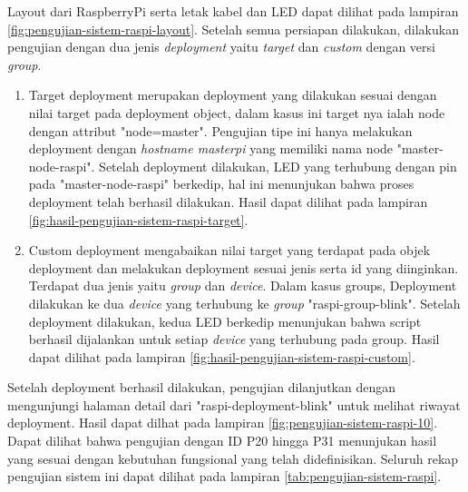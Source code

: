 Layout dari RaspberryPi serta letak kabel dan LED dapat dilihat pada lampiran \ref{fig:pengujian-sistem-raspi-layout}. Setelah semua persiapan dilakukan, dilakukan pengujian dengan dua jenis \textit{deployment} yaitu \textit{target} dan \textit{custom} dengan versi \textit{group}.
\begin{enumerate}
  \item Target deployment merupakan deployment yang dilakukan sesuai dengan nilai target pada deployment object, dalam kasus ini target nya ialah node dengan attribut "node=master". Pengujian tipe ini hanya melakukan deployment dengan \textit{hostname masterpi} yang memiliki nama node "master-node-raspi". Setelah deployment dilakukan, LED yang terhubung dengan pin pada "master-node-raspi" berkedip, hal ini menunjukan bahwa proses deployment telah berhasil dilakukan. Hasil dapat dilihat pada lampiran \ref{fig:hasil-pengujian-sistem-raspi-target}.
  \item Custom deployment mengabaikan nilai target yang terdapat pada objek deployment dan melakukan deployment sesuai jenis serta id yang diinginkan. Terdapat dua jenis yaitu \textit{group} dan \textit{device}. Dalam kasus groups, Deployment dilakukan ke dua \textit{device} yang terhubung ke \textit{group} "raspi-group-blink". Setelah deployment dilakukan, kedua LED berkedip menunjukan bahwa script berhasil dijalankan untuk setiap \textit{device} yang terhubung pada group. Hasil dapat dilihat pada lampiran \ref{fig:hasil-pengujian-sistem-raspi-custom}.
\end{enumerate}

Setelah deployment berhasil dilakukan, pengujian dilanjutkan dengan mengunjungi halaman detail dari "raspi-deployment-blink" untuk melihat riwayat deployment. Hasil dapat dilhat pada lampiran \ref{fig:pengujian-sistem-raspi-10}. Dapat dilihat bahwa pengujian dengan ID P20 hingga P31 menunjukan hasil yang sesuai dengan kebutuhan fungsional yang telah didefinisikan. Seluruh rekap pengujian sistem ini dapat dilihat pada lampiran \ref{tab:pengujian-sistem-raspi}.